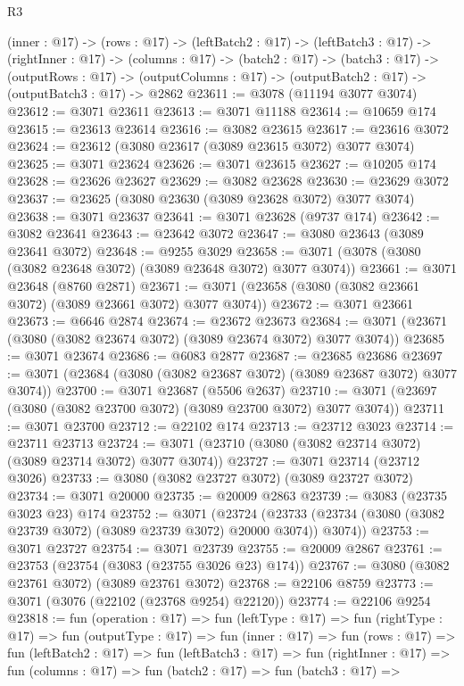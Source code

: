 \begin{lexlean}{R3}
\begin{coremodule}
  (inner : @17) ->
  (rows : @17) ->
  (leftBatch2 : @17) ->
  (leftBatch3 : @17) ->
  (rightInner : @17) ->
  (columns : @17) ->
  (batch2 : @17) ->
  (batch3 : @17) ->
  (outputRows : @17) ->
  (outputColumns : @17) -> (outputBatch2 : @17) -> (outputBatch3 : @17) -> @2862
@23611 := @3078 (@11194 @3077 @3074)
@23612 := @3071 @23611
@23613 := @3071 @11188
@23614 := @10659 @174
@23615 := @23613 @23614
@23616 := @3082 @23615
@23617 := @23616 @3072
@23624 := @23612 (@3080 @23617 (@3089 @23615 @3072) @3077 @3074)
@23625 := @3071 @23624
@23626 := @3071 @23615
@23627 := @10205 @174
@23628 := @23626 @23627
@23629 := @3082 @23628
@23630 := @23629 @3072
@23637 := @23625 (@3080 @23630 (@3089 @23628 @3072) @3077 @3074)
@23638 := @3071 @23637
@23641 := @3071 @23628 (@9737 @174)
@23642 := @3082 @23641
@23643 := @23642 @3072
@23647 := @3080 @23643 (@3089 @23641 @3072)
@23648 := @9255 @3029
@23658 := @3071 (@3078 (@3080 (@3082 @23648 @3072) (@3089 @23648 @3072) @3077 @3074))
@23661 := @3071 @23648 (@8760 @2871)
@23671 := @3071 (@23658 (@3080 (@3082 @23661 @3072) (@3089 @23661 @3072) @3077 @3074))
@23672 := @3071 @23661
@23673 := @6646 @2874
@23674 := @23672 @23673
@23684 := @3071 (@23671 (@3080 (@3082 @23674 @3072) (@3089 @23674 @3072) @3077 @3074))
@23685 := @3071 @23674
@23686 := @6083 @2877
@23687 := @23685 @23686
@23697 := @3071 (@23684 (@3080 (@3082 @23687 @3072) (@3089 @23687 @3072) @3077 @3074))
@23700 := @3071 @23687 (@5506 @2637)
@23710 := @3071 (@23697 (@3080 (@3082 @23700 @3072) (@3089 @23700 @3072) @3077 @3074))
@23711 := @3071 @23700
@23712 := @22102 @174
@23713 := @23712 @3023
@23714 := @23711 @23713
@23724 := @3071 (@23710 (@3080 (@3082 @23714 @3072) (@3089 @23714 @3072) @3077 @3074))
@23727 := @3071 @23714 (@23712 @3026)
@23733 := @3080 (@3082 @23727 @3072) (@3089 @23727 @3072)
@23734 := @3071 @20000
@23735 := @20009 @2863
@23739 := @3083 (@23735 @3023 @23) @174
@23752 := @3071
    (@23724 (@23733 (@23734 (@3080 (@3082 @23739 @3072) (@3089 @23739 @3072) @20000 @3074)) @3074))
@23753 := @3071 @23727
@23754 := @3071 @23739
@23755 := @20009 @2867
@23761 := @23753 (@23754 (@3083 (@23755 @3026 @23) @174))
@23767 := @3080 (@3082 @23761 @3072) (@3089 @23761 @3072)
@23768 := @22106 @8759
@23773 := @3071 (@3076 (@22102 (@23768 @9254) @22120))
@23774 := @22106 @9254
@23818 := fun (operation : @17) =>
  fun (leftType : @17) =>
  fun (rightType : @17) =>
  fun (outputType : @17) =>
  fun (inner : @17) =>
  fun (rows : @17) =>
  fun (leftBatch2 : @17) =>
  fun (leftBatch3 : @17) =>
  fun (rightInner : @17) =>
  fun (columns : @17) =>
  fun (batch2 : @17) =>
  fun (batch3 : @17) =>

\end{coremodule}
\end{lexlean}
